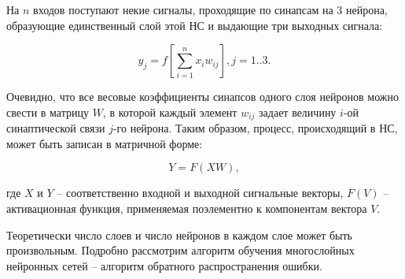 На $n$ входов поступают некие сигналы, проходящие по синапсам на $3$ нейрона, образующие единственный слой этой НС и выдающие три выходных сигнала:

\begin{equation}
    y_j = f\left[\sum_{i=1}^{n}{x_i w_{i j}}\right], j = 1..3.
\end{equation}

Очевидно, что все весовые коэффициенты синапсов одного слоя нейронов можно свести в матрицу $W$, в которой каждый элемент $w_{i j}$ задает величину $i$-ой синаптической связи $j$-го нейрона. Таким образом, процесс, происходящий в НС, может быть записан в матричной форме:

\begin{equation}
    Y = F(X W),
\end{equation}

где $X$ и $Y$ – соответственно входной и выходной сигнальные векторы, $F(V)$ – активационная функция, применяемая поэлементно к компонентам вектора $V$.

Теоретически число слоев и число нейронов в каждом слое может быть произвольным. Подробно рассмотрим алгоритм обучения многослойных нейронных сетей – алгоритм обратного распространения ошибки.
